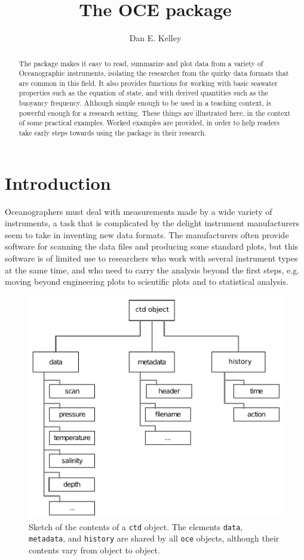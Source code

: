 \documentclass{article}
\begin{document}
\title{The OCE package}
\author{Dan E. Kelley}
\maketitle


\begin{abstract}

The \verb@oce@ package makes it easy to read, summarize and plot data from a
variety of Oceanographic instruments, isolating the researcher from the quirky
data formats that are common in this field. It also provides functions for
working with basic seawater properties such as the equation of state, and with
derived quantities such as the buoyancy frequency.  Although simple enough to be
used in a teaching context, \verb@oce@ is powerful enough for a research
setting.  These things are illustrated here, in the context of some practical
examples.  Worked examples are provided, in order to help readers take early
steps towards using the \verb@oce@ package in their research.

\end{abstract}

\section{Introduction}

Oceanographers must deal with measurements made by a wide variety of
instruments, a task that is complicated by the delight instrument manufacturers
seem to take in inventing new data formats. The manufacturers often provide
software for scanning the data files and producing some standard plots, but this
software is of limited use to researchers who work with several instrument types
at the same time, and who need to carry the analysis beyond the first steps,
e.g. moving beyond engineering plots to scientific plots and to statistical
analysis.

\begin{figure}[ht]
  \begin{center}
    \includegraphics[width=0.5\hsize]{ctd-object}
  \end{center}
  \caption{\label{f:ctdobject}Sketch of the contents of a \texttt{ctd}
    object. The elements \texttt{data}, \texttt{metadata}, and
    \texttt{history} are shared by all \texttt{oce} objects, although
    their contents vary from object to object.}
\end{figure}
\end{document}
